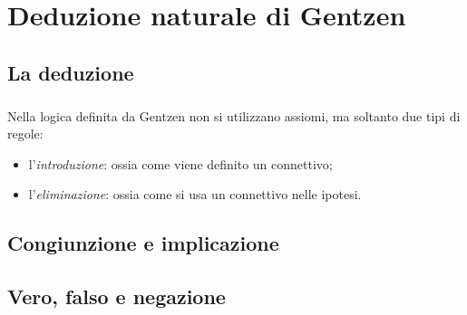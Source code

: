 \chapter{Deduzione naturale di Gentzen}

\section{La deduzione}

\paragraph{}
Nella logica definita da Gentzen non si utilizzano assiomi, ma soltanto due tipi di regole:

\begin{itemize}
    \item l'\textit{introduzione}: ossia come viene definito un connettivo;
    \item l'\textit{eliminazione}: ossia come si usa un connettivo nelle ipotesi.
\end{itemize}

\section{Congiunzione e implicazione}





\section{Vero, falso e negazione}


